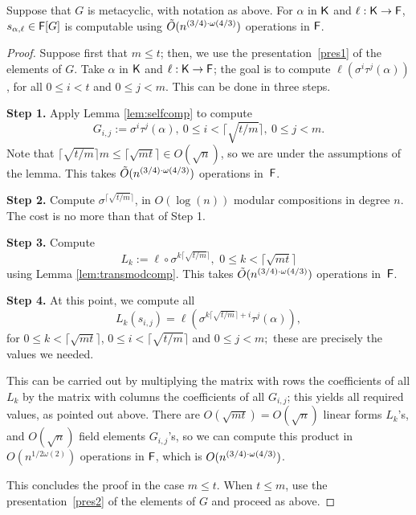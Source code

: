 \begin{proposition}
  Suppose that $G$ is metacyclic, with notation as above. For $\alpha$
  in ${\mathsf{K}}$ and $\ell:{\mathsf{K}}\to{\mathsf{F}}$, $s_{\alpha,\ell} \in {\mathsf{F}}[G]$ is
  computable using $\tilde{O}(n^{(3/4)\cdot \omega(4/3)})$ operations in ${\mathsf{F}}$.
\end{proposition}
\begin{proof}
  Suppose first that $m \le t$; then, we use the
  presentation~\eqref{pres1} of the elements of $G$. Take $\alpha$ in
  ${\mathsf{K}}$ and $\ell:{\mathsf{K}} \to {\mathsf{F}}$; the goal is to compute
  $\ell(\sigma^i\tau^j (\alpha))$, for all $0\leq i < t$ and $0 \leq j
  <m.$ This can be done in three steps.

\smallskip\noindent\textbf{Step 1.} Apply Lemma \ref{lem:selfcomp} to compute
$$G_{i,j} := \sigma^i\tau^j(\alpha),\ 0\leq i < \lceil \sqrt{t/m}
\rceil,\ 0 \leq j < m.$$ Note that $\lceil \sqrt{t/m} \rceil m \leq
\lceil \sqrt{mt} \rceil \in O(\sqrt n)$, so we are under the assumptions
of the lemma. This takes  $\tilde{O}(n^{(3/4)\cdot \omega(4/3)})$ operations in~${\mathsf{F}}$.

\smallskip\noindent\textbf{Step 2.} Compute $\sigma^{\lceil \sqrt{t/m}
\rceil}$, in $O(\log(n))$ modular compositions in degree $n$. The cost
is no more than that of Step 1.

\smallskip\noindent\textbf{Step 3.} Compute $$L_k := \ell \circ
\sigma^{k\lceil \sqrt{t/m} \rceil}, \,\, 0\leq k < \lceil
\sqrt{mt}\rceil$$ using Lemma \ref{lem:transmodcomp}.
This takes  $\tilde{O}(n^{(3/4)\cdot \omega(4/3)})$ operations in~${\mathsf{F}}$.

\smallskip\noindent\textbf{Step 4.} At this point, we compute all
$$ L_k(s_{i,j}) = \ell(\sigma^{k\lceil \sqrt{t/m} \rceil + i}\tau
^j(\alpha)),$$ for $0\le k < \lceil \sqrt{mt}\rceil$, $0\le i< \lceil
\sqrt{t/m}\rceil$ and $0 \leq j < m;$ these are precisely 
the values we needed.

This can be carried out by multiplying the matrix with rows the
coefficients of all $L_k$ by the matrix with columns the coefficients
of all $G_{i,j}$; this yields all required values, as pointed out
above. There are $O(\sqrt{mt})=O(\sqrt{n})$ linear forms $L_k$'s, and
$O(\sqrt{n})$ field elements $G_{i,j}$'s, so we can compute this product
in $O(n^{1/2\omega(2)})$ operations in ${\mathsf{F}}$, which is $O(n^{(3/4)\cdot \omega(4/3)})$.

This concludes the proof in the case $m \le t$. When $t \le m$, use the
presentation~\eqref{pres2} of the elements of $G$ and proceed as
above.
\end{proof}


